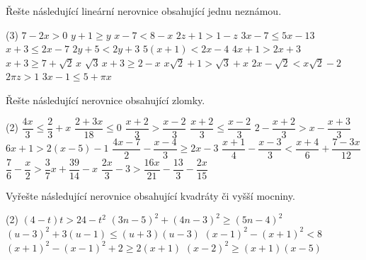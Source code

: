 \documentclass[12pt,a4paper]{article}
\begin{document}
\begin{exercise}
  Řešte následující lineární nerovnice obsahující jednu neznámou.
  \begin{tasks}(3)
    \task \(7 - 2x > 0\)
    \task \(y + 1 \ge y\)
    \task \(x - 7 < 8 - x\)
    \task \(2z + 1 > 1 - z\)
    \task \(3x - 7 \le 5x - 13\)
    \task \(x + 3 \le 2x - 7\)
    \task \(2y + 5 < 2y + 3\)
    \task \(5(x + 1) < 2x - 4\)
    \task $4x + 1 > 2x + 3$
    \task \(x + 3 \ge 7 + \sqrt{2}\,x\)
    \task \(\sqrt{3}\,x + 3 \ge 2 - x\)
    \task \(x\sqrt{2} + 1 > \sqrt{3} + x\)
    \task \(2x - \sqrt{2} < x\sqrt{2} - 2\)
    \task \(2\pi z > 1\)
    \task \(3x - 1 \le 5 + \pi x\)
  \end{tasks}
\end{exercise}


\begin{exercise}
  Řešte následující nerovnice obsahující zlomky.  
  \begin{tasks}(2)
    \task \(\dfrac{4x}{3} \le \dfrac{2}{3} + x\)
    \task $\dfrac{2+3x}{18} \le 0$
    \task $\dfrac{x+2}{3} > \dfrac{x-2}{3}$
    \task $\dfrac{x+2}{3} \le \dfrac{x-2}{3}$
    \task \(2 - \dfrac{x+2}{3} > x - \dfrac{x+3}{3}\)
    \task \(6x + 1 > 2(x - 5) - 1\)
    \task \(\dfrac{4x - 7}{2} - \dfrac{x - 4}{3} \ge 2x - 3\)
    \task \(\dfrac{x+1}{4} - \dfrac{x-3}{3} < \dfrac{x+4}{6} + \dfrac{7 - 3x}{12}\)
    \task $\dfrac{7}{6} - \dfrac{x}{2} > \dfrac{3}{7}x + \dfrac{39}{14}-x$
    \task $\dfrac{2x}{3} - 3 > \dfrac{16x}{21} - \dfrac{13}{3} - \dfrac{2x}{15}$
  \end{tasks}
\end{exercise}


\begin{exercise}
  Vyřešte následující nerovnice obsahující kvadráty či vyšší mocniny.
  \begin{tasks}(2)
    \task \((4 - t)t > 24 - t^{2}\)
    \task \((3n - 5)^{2} + (4n - 3)^{2} \ge (5n - 4)^{2}\)
    \task \((u - 3)^{2} + 3(u - 1) \le (u + 3)(u - 3)\)
    \task \((x - 1)^{2} - (x + 1)^{2} < 8\)
    \task \((x + 1)^{2} - (x - 1)^{2} + 2 \ge 2(x + 1)\)
    \task \((x - 2)^{2} \ge (x + 1)(x - 5)\)
  \end{tasks}
\end{exercise}
\end{document}
